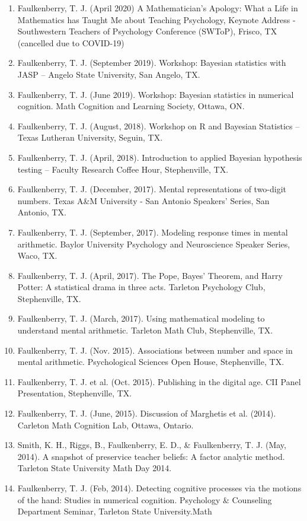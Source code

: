 \documentclass[article,10pt]{article}
\begin{document}
\begin{enumerate}
\item Faulkenberry, T. J. (April 2020) A Mathematician's Apology: What a Life in Mathematics has Taught Me about Teaching Psychology,  Keynote Address - Southwestern Teachers of Psychology Conference (SWToP), Frisco, TX (cancelled due to COVID-19)
\item Faulkenberry, T. J. (September 2019). Workshop: Bayesian statistics with JASP -- Angelo State University, San Angelo, TX.
\item Faulkenberry, T. J. (June 2019). Workshop: Bayesian statistics in numerical cognition. Math Cognition and Learning Society, Ottawa, ON.
\item Faulkenberry, T. J. (August, 2018). Workshop on R and Bayesian Statistics -- Texas Lutheran University, Seguin, TX.
\item Faulkenberry, T. J. (April, 2018). Introduction to applied Bayesian hypothesis testing -- Faculty Research Coffee Hour, Stephenville, TX.
\item Faulkenberry, T. J. (December, 2017). Mental representations of two-digit numbers. Texas A\&M University - San Antonio Speakers' Series, San Antonio, TX.
\item Faulkenberry, T. J. (September, 2017). Modeling response times in mental arithmetic. Baylor University Psychology and Neuroscience Speaker Series, Waco, TX.
\item Faulkenberry, T. J. (April, 2017). The Pope, Bayes' Theorem, and Harry Potter: A statistical drama in three acts.  Tarleton Psychology Club, Stephenville, TX.
\item Faulkenberry, T. J. (March, 2017). Using mathematical modeling to understand mental arithmetic. Tarleton Math Club, Stephenville, TX.
\item Faulkenberry, T. J. (Nov. 2015). Associations between number and space in mental arithmetic.  Psychological Sciences Open House, Stephenville, TX.
\item Faulkenberry, T. J. et al. (Oct. 2015). Publishing in the digital age.  CII Panel Presentation, Stephenville, TX.
\item Faulkenberry, T. J. (June, 2015). Discussion of Marghetis et al. (2014). Carleton Math Cognition Lab, Ottawa, Ontario.
\item Smith, K. H., Riggs, B., Faulkenberry, E. D., \& Faulkenberry, T. J. (May, 2014). A snapshot of preservice teacher beliefs: A factor analytic method. Tarleton State University Math Day 2014.
\item Faulkenberry, T. J. (Feb, 2014). Detecting cognitive processes via the motions of the hand: Studies in numerical cognition.  Psychology \& Counseling Department Seminar, Tarleton State University.Math

\end{enumerate}
\end{document}
